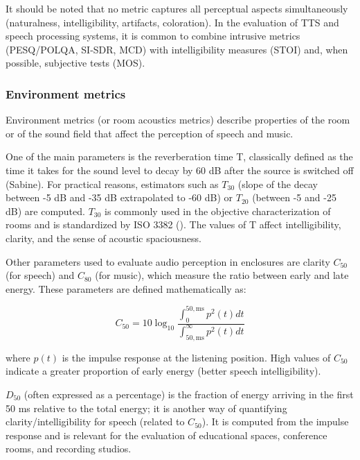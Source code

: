 It should be noted that no metric captures all perceptual aspects simultaneously (naturalness, intelligibility, artifacts, coloration). In the evaluation of TTS and speech processing systems, it is common to combine intrusive metrics (PESQ/POLQA, SI-SDR, MCD) with intelligibility measures (STOI) and, when possible, subjective tests (MOS).

\subsubsection{Environment metrics}
Environment metrics (or room acoustics metrics) describe properties of the room or of the sound field that affect the perception of speech and music.

One of the main parameters is the reverberation time T, classically defined as the time it takes for the sound level to decay by 60 dB after the source is switched off (Sabine). For practical reasons, estimators such as $T_{30}$ (slope of the decay between -5 dB and -35 dB extrapolated to -60 dB) or $T_{20}$ (between -5 and -25 dB) are computed. $T_{30}$ is commonly used in the objective characterization of rooms and is standardized by ISO 3382 (\cite{T30}). The values of T affect intelligibility, clarity, and the sense of acoustic spaciousness.

Other parameters used to evaluate audio perception in enclosures are clarity $C_{50}$ (for speech) and $C_{80}$ (for music), which measure the ratio between early and late energy. These parameters are defined mathematically as:

\begin{equation}
    C_{50} = 10\log_{10}\frac{\int_{0}^{50,\mathrm{ms}} p^{2}(t)dt}{\int_{50,\mathrm{ms}}^{\infty} p^{2}(t)dt}
\end{equation}

where $p(t)$ is the impulse response at the listening position. High values of $C_{50}$ indicate a greater proportion of early energy (better speech intelligibility).


$D_{50}$ (often expressed as a percentage) is the fraction of energy arriving in the first 50 ms relative to the total energy; it is another way of quantifying clarity/intelligibility for speech (related to $C_{50}$). It is computed from the impulse response and is relevant for the evaluation of educational spaces, conference rooms, and recording studios.

